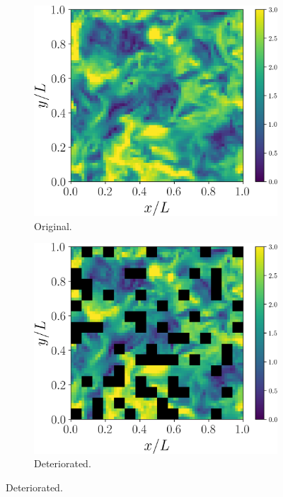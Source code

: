 \documentclass[review]{elsarticle}
\begin{document}
\begin{figure}[!tbp]%
  \centering%
  \begin{subfigure}[t]{0.32\textwidth}%
    \includegraphics[width=\textwidth]{./figs/umag0.png}%
    \caption{Original.}\label{fig:original}%
  \end{subfigure}%
  \hfill%
  \begin{subfigure}[t]{0.32\textwidth}%
    \includegraphics[width=\textwidth]{./figs/umag0_masked.png}%
    \caption{Deteriorated.}\label{fig:masked}%

\end{subfigure}
\end{figure}
\end{document}

